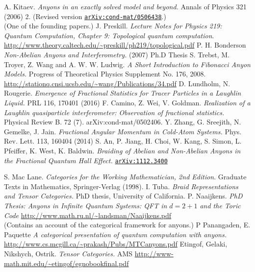 \documentclass[a4paper,10pt,oneside]{book}
\theoremstyle{plain}
\theoremstyle{definition}
\theoremstyle{remark}
\begin{document}
\begin{thebibliography}{99}
   A. Kitaev. \textit{Anyons in an exactly solved model and beyond.} Annals of Physics 321 (2006) 2. (Revised version \href{https://arxiv.org/abs/cond-mat/0506438}{\texttt{arXiv:cond-mat/0506438}}.) \\\relax (One of the founding papers.)
   J. Preskill. \textit{Lecture Notes for Physics 219: Quantum Computation, Chapter 9: Topological quantum computation}. \\ \url{http://www.theory.caltech.edu/~preskill/ph219/topological.pdf}
   P. H. Bonderson \textit{Non-Abelian Anyons and Interferometry.} (2007) Ph.D Thesis
   S. Trebst, M. Troyer, Z. Wang and A. W. W. Ludwig. \textit{A Short Introduction to Fibonacci Anyon Models.} Progress of Theoretical Physics Supplement No. 176, 2008. \\ \url{http://stationq.cnsi.ucsb.edu/~wang/Publications/34.pdf}
   D. Lundholm, N. Rougerie. \textit{Emergence of Fractional Statistics for Tracer Particles in a Laughlin Liquid.} PRL 116, 170401 (2016)
   F. Camino, Z. Wei, V. Goldman. \textit{Realization of a Laughlin quasiparticle interferometer: Observation of fractional statistics.} Physical Review B. 72 (7). arXiv:cond-mat/0502406.
   Y. Zhang, G. Sreejith, N. Gemelke, J. Jain. \textit{Fractional Angular Momentum in Cold-Atom Systems.} Phys. Rev. Lett. 113, 160404 (2014)
   S. An, P. Jiang, H. Choi, W. Kang, S. Simon, L. Pfeiffer, K. West, K. Baldwin. \textit{Braiding of Abelian and Non-Abelian Anyons in the Fractional Quantum Hall Effect.} \href{https://arxiv.org/abs/1112.3400}{\texttt{arXiv:1112.3400}}

   S. Mac Lane. \textit{Categories for the Working Mathematician, 2nd Edition}. Graduate Texts in Mathematics, Springer-Verlag (1998).
   I. Tuba. \textit{Braid Representations and Tensor Categories.} PhD thesis, University of California.
   P. Naaijkens. \textit{PhD Thesis: Anyons in Infinite Quantum Systems: QFT in $d=2+1$ and the Toric Code} \url{http://www.math.ru.nl/~landsman/Naaijkens.pdf} \\\relax (Contains an account of the categorical framework for anyons.)
   P Panangaden, E. Paquette \textit{A categorical presentation of quantum computation with anyons.} \\ \url{http://www.cs.mcgill.ca/~prakash/Pubs/MTCanyons.pdf}
   Etingof, Gelaki, Nikshych, Ostrik. \textit{Tensor Categories.} AMS \url{http://www-math.mit.edu/~etingof/egnobookfinal.pdf}


\end{thebibliography}
\end{document}
